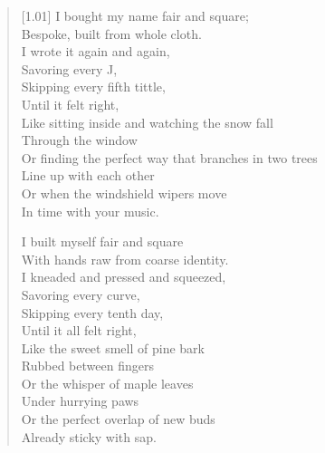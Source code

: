 \begin{verse}[1.01\textwidth]
I bought my name fair and square;\\
Bespoke, built from whole cloth.\\
I wrote it again and again,\\
Savoring every J,\\
Skipping every fifth tittle,\\
Until it felt right,\\
Like sitting inside and watching the snow fall\\
\vin Through the window\\
Or finding the perfect way that branches in two trees\\
\vin Line up with each other\\
Or when the windshield wipers move\\
\vin In time with your music.

I built myself fair and square\\
With hands raw from coarse identity.\\
I kneaded and pressed and squeezed,\\
Savoring every curve,\\
Skipping every tenth day,\\
Until it all felt right,\\
Like the sweet smell of pine bark\\
\vin Rubbed between fingers\\
Or the whisper of maple leaves\\
\vin Under hurrying paws\\
Or the perfect overlap of new buds\\
\vin Already sticky with sap.
\end{verse}
